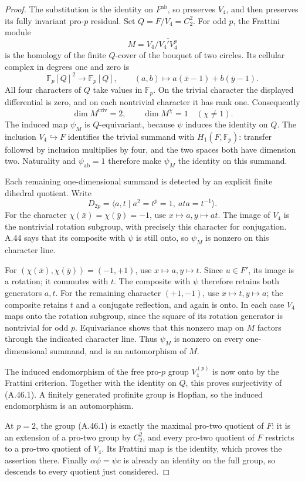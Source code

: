 \begin{proof}
The substitution is the identity on \(F^{\mathrm{ab}}\),
so preserves \(V_4\), and then preserves its fully invariant
pro-\(p\) residual. Set \(Q=F/V_4=C_2^2\).
For odd \(p\), the Frattini module
\[
 M=V_4/\overline{V_4'V_4^p}
\]
is the homology of the finite \(Q\)-cover of the
bouquet of two circles. Its cellular complex in degrees
one and zero is
\[
 \mathbb F_p[Q]^2\longrightarrow\mathbb F_p[Q],
 \qquad (a,b)\longmapsto
       a(\bar x-1)+b(\bar y-1).
\]
All four characters of \(Q\) take values in
\(\mathbb F_p\). On the trivial character the displayed
differential is zero, and on each nontrivial character
it has rank one. Consequently
\[
             \dim M^{\mathrm{triv}}=2,
 \qquad \dim M^\chi=1\quad(\chi\ne1).
 \tag{A.46.2}
\]
The induced map \(\psi_M\) is \(Q\)-equivariant,
because \(\psi\) induces the identity on \(Q\).
The inclusion \(V_4\hookrightarrow F\) identifies
the trivial summand with \(H_1(F,\mathbb F_p)\):
transfer followed by inclusion multiplies by four,
and the two spaces both have dimension two.
Naturality and \(\psi_{\mathrm{ab}}=1\) therefore
make \(\psi_M\) the identity on this summand.

Each remaining one-dimensional summand is detected by
an explicit finite dihedral quotient. Write
\[
 D_{2p}=\langle a,t\mid a^2=t^p=1,
                          \ ata=t^{-1}\rangle.
\]
For the character \(\chi(\bar x)=\chi(\bar y)=-1\),
use \(x\mapsto a,y\mapsto at\). The image of
\(V_4\) is the nontrivial rotation subgroup,
with precisely this character for conjugation.
A.44 says that its composite with \(\psi\)
is still onto, so \(\psi_M\) is nonzero on this
character line.

For \((\chi(\bar x),\chi(\bar y))=(-1,+1)\),
use \(x\mapsto a,y\mapsto t\). Since
\(u\in F'\), its image is a rotation; it commutes
with \(t\). The composite with \(\psi\) therefore
retains both generators \(a,t\). For the remaining
character \((+1,-1)\), use
\(x\mapsto t,y\mapsto a\); the composite retains
\(t\) and a conjugate reflection, and again is
onto. In each case \(V_4\) maps onto the rotation
subgroup, since the square of its rotation generator
is nontrivial for odd \(p\). Equivariance shows that
this nonzero map on \(M\) factors through the
indicated character line. Thus \(\psi_M\) is
nonzero on every one-dimensional summand, and is
an automorphism of \(M\).

The induced endomorphism of the free pro-\(p\)
group \(V_4^{(p)}\) is now onto by the Frattini
criterion. Together with the identity on \(Q\),
this proves surjectivity of (A.46.1). A finitely
generated profinite group is Hopfian, so the induced
endomorphism is an automorphism.

At \(p=2\), the group (A.46.1) is exactly the
maximal pro-two quotient of \(F\): it is an
extension of a pro-two group by \(C_2^2\), and
every pro-two quotient of \(F\) restricts to
a pro-two quotient of \(V_4\). Its Frattini map
is the identity, which proves the assertion there.
Finally \(\alpha\psi=\psi c\) is already an
identity on the full group, so descends to every
quotient just considered.
\end{proof}


